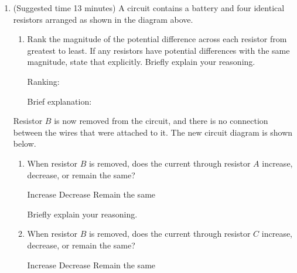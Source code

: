 \documentclass{../../../oss-classkick}
\begin{document}
\begin{center}
\end{center}
\begin{enumerate}
\item (Suggested time 13 minutes) A circuit contains a battery and four
  identical resistors arranged as shown in the diagram above.
  \begin{enumerate}
  \item Rank the magnitude of the potential difference across each resistor
    from greatest to least. If any resistors have potential differences with
    the same magnitude, state that explicitly. Briefly explain your reasoning.

    \vspace{.1in}Ranking:
    
    \vspace{.3in}Brief explanation:
  \end{enumerate}
  \vspace{.3in}Resistor $B$ is now removed from the circuit, and there is no
  connection between the wires that were attached to it. The new circuit
  diagram is shown below.
  \begin{center}
  \end{center}
  \begin{enumerate}[resume]
  \item When resistor $B$ is removed, does the current through resistor $A$
    increase, decrease, or remain the same?

    \vspace{.1in}
    \underline{\hspace{.3in}} Increase\hspace{.2in}
    \underline{\hspace{.3in}} Decrease\hspace{.2in}
    \underline{\hspace{.3in}} Remain the same
    
    \vspace{.1in}Briefly explain your reasoning.\vspace{.4in}
    
  \item When resistor $B$ is removed, does the current through resistor $C$
    increase, decrease, or remain the same?

    \vspace{.1in}
    \underline{\hspace{.3in}} Increase\hspace{.2in}
    \underline{\hspace{.3in}} Decrease\hspace{.2in}
    \underline{\hspace{.3in}} Remain the same
    

\end{enumerate}
\end{enumerate}
\end{document}
